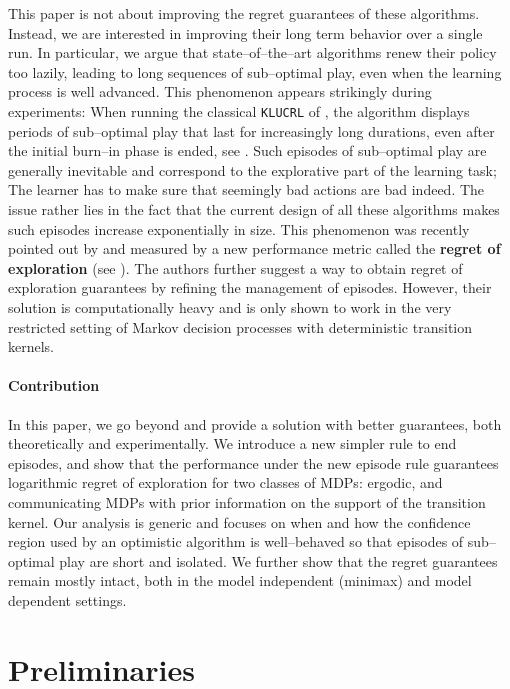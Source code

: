 \documentclass[preprint,cleveref,12pt]{colt2025}
\newcommand{\strong}[1]{\textbf{#1}}
\begin{document}
    This paper is not about improving the regret guarantees of these algorithms.
    Instead, we are interested in improving their long term behavior over a single run.
    In particular, we argue that state--of--the--art algorithms renew their policy too lazily, leading to long sequences of sub--optimal play, even when the learning process is well advanced. 
    This phenomenon appears strikingly during experiments: When running the classical \texttt{KLUCRL} of \cite{filippi_optimism_2010}, the algorithm displays periods of sub--optimal play that last for increasingly long durations, even after the initial burn--in phase is ended, see . 
    Such episodes of sub--optimal play are generally inevitable and correspond to the explorative part of the learning task; The learner has to make sure that seemingly bad actions are bad indeed. 
    The issue rather lies in the fact that the current design of all these algorithms makes such episodes increase exponentially in size. 
    This phenomenon was recently pointed out by \cite{boone_regret_2023} and measured by a new performance metric called the \strong{regret of exploration} (see ).
    The authors further suggest a way to obtain regret of exploration guarantees by refining the management of episodes. 
    However, their solution is computationally heavy and is only shown to work in the very restricted setting of Markov decision processes with deterministic transition kernels. 

    \paragraph{Contribution}
    In this paper, we go beyond \cite{boone_regret_2023} and provide a solution with better guarantees, both theoretically and experimentally. 
    We introduce a new simpler rule to end episodes, and show that the performance under the new episode rule guarantees logarithmic regret of exploration for two classes of MDPs: ergodic, and communicating MDPs with prior information on the support of the transition kernel.
    Our analysis is generic and focuses on when and how the confidence region used by an optimistic algorithm is well--behaved so that episodes of sub--optimal play are short and isolated. 
    We further show that the regret guarantees remain mostly intact, both in the model independent (minimax) and model dependent settings. 

    \section{Preliminaries}
\end{document}
